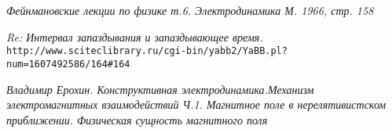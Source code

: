 \documentclass{article}
\begin{document}
\begin{thebibliography}{99}



\textit{Фейнмановские лекции по физике т.6. Электродинамика М. 1966, стр. 158}

\textit{Re: Интервал запаздывания и запаздывающее время.}
\\\texttt{http://www.sciteclibrary.ru/cgi-bin/yabb2/YaBB.pl?num=1607492586/164\#164}

\textit{Владимир Ерохин. Конструктивная электродинамика.Механизм электромагнитных взаимодействий Ч.1. Магнитное поле в нерелятивистском приближении. Физическая сущность магнитного поля}








\end{thebibliography}
\end{document}
